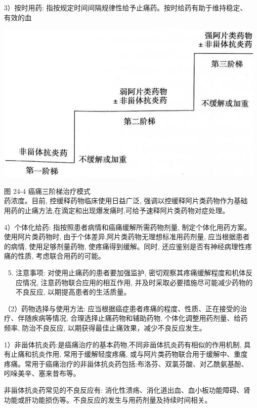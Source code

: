 \documentclass[10pt]{article}
\begin{document}
3）按时用药: 指按规定时间间隔规律性给予止痛药。按时给药有助于维持稳定、有效的血

\begin{center}
\includegraphics[max width=\textwidth]{2024_07_09_002a177993bd97d1d6d7g-258}
\end{center}

图 24-4 癌痛三阶梯治疗模式\\
药浓度。目前, 控缓释药物临床使用日益广泛, 强调以控缓释阿片类药物作为基础用药的止痛方法,在滴定和出现爆发痛时,可给予速释阿片类药物对症处理。

4）个体化给药: 指按照患者病情和癌痛缓解所需药物剂量, 制定个体化用药方案。使用阿片类药物时, 由于个体差异,阿片类药物无理想标准用药剂量, 应当根据患者的病情, 使用足够剂量药物, 使疼痛得到缓解。同时, 还应鉴别是否有神经病理性疼痛的性质, 考虑联合用药的可能。

\begin{enumerate}
  \setcounter{enumi}{4}
  \item 注意事项: 对使用止痛药的患者要加强监护, 密切观察其疼痛缓解程度和机体反应情况, 注意药物联合应用的相互作用, 并及时采取必要措施尽可能减少药物的不良反应, 以期提高患者的生活质量。
\end{enumerate}

（2）药物选择与使用方法: 应当根据癌症患者疼痛的程度、性质、正在接受的治疗、伴随疾病等情况, 合理选择止痛药物和辅助药物, 个体化调整用药剂量、给药频率, 防治不良反应, 以期获得最佳止痛效果，减少不良反应发生。

1）非甾体抗炎药:是癌痛治疗的基本药物,不同非甾体抗炎药有相似的作用机制, 具有止痛和抗炎作用, 常用于缓解轻度疼痛, 或与阿片类药物联合用于缓解中、重度疼痛。常用于癌痛治疗的非甾体抗炎药包括:布洛芬、双氯芬酸、对乙酰氨基酚、吲哚美辛、塞来昔布等。

非甾体抗炎药常见的不良反应有: 消化性溃疡、消化道出血、血小板功能障碍、肾功能或肝功能损伤等。不良反应的发生与用药剂量及持续时间相关。
\end{document}
